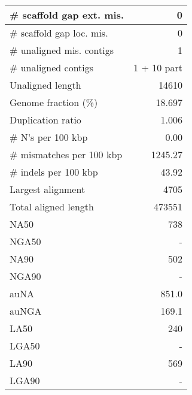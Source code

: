 \documentclass[12pt,a4paper]{article}
\begin{document}
\begin{table}[ht]
\begin{center}
\begin{tabular}{|l*{1}{|r}|}
\# scaffold gap ext. mis. & 0 \\ \hline
\# scaffold gap loc. mis. & 0 \\ \hline
\# unaligned mis. contigs & 1 \\ \hline
\# unaligned contigs & 1 + 10 part \\ \hline
Unaligned length & 14610 \\ \hline
Genome fraction (\%) & 18.697 \\ \hline
Duplication ratio & 1.006 \\ \hline
\# N's per 100 kbp & 0.00 \\ \hline
\# mismatches per 100 kbp & 1245.27 \\ \hline
\# indels per 100 kbp & 43.92 \\ \hline
Largest alignment & 4705 \\ \hline
Total aligned length & 473551 \\ \hline
NA50 & 738 \\ \hline
NGA50 & - \\ \hline
NA90 & 502 \\ \hline
NGA90 & - \\ \hline
auNA & 851.0 \\ \hline
auNGA & 169.1 \\ \hline
LA50 & 240 \\ \hline
LGA50 & - \\ \hline
LA90 & 569 \\ \hline
LGA90 & - \\ \hline
\end{tabular}
\end{center}
\end{table}
\end{document}
